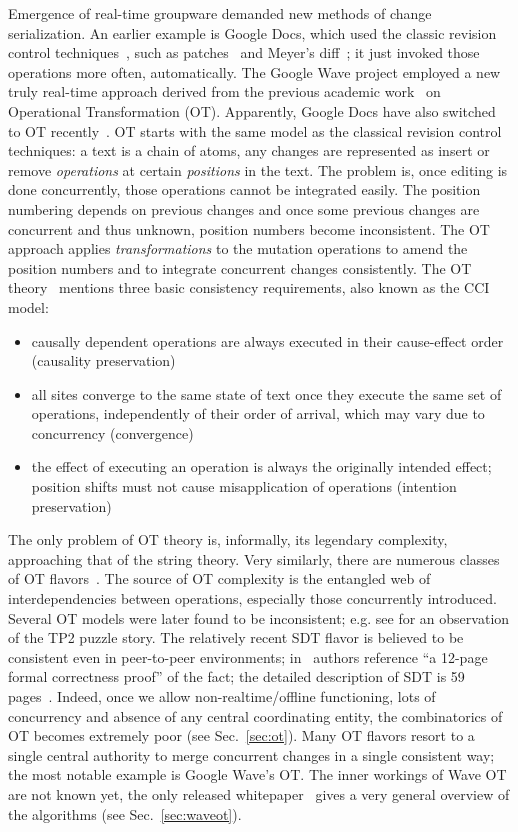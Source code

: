 \documentclass{sig-alternate}
\newenvironment{tightitem}{
\begin{itemize}
  \setlength{\itemsep}{1pt}
  \setlength{\parskip}{0pt}
  \setlength{\parsep}{0pt}}{\end{itemize}
}
\begin{document}
Emergence of real-time groupware demanded new methods of change serialization.
An earlier example is Google Docs, which used the classic revision control techniques~\cite{diff-match-patch}, such as patches~\cite{patch} and Meyer's diff~\cite{meyers-diff}; it just invoked those operations more often, automatically.
The Google Wave project employed a new truly real-time approach derived from the previous academic work~\cite{jupiter} on Operational Transformation (OT).
Apparently, Google Docs have also switched to OT recently~\cite{own-experience}.
OT starts with the same model as the classical revision control techniques: a text is a chain of atoms, any changes are represented as insert or remove \emph{operations} at certain \emph{positions} in the text.
The problem is, once editing is done concurrently, those operations cannot be integrated easily.
The position numbering depends on previous changes and once some previous changes are concurrent and thus unknown, position numbers become inconsistent.
The OT approach applies \emph{transformations} to the mutation operations to amend the position numbers and to integrate concurrent changes consistently. The OT theory~\cite{sun-achieving} mentions three basic consistency requirements, also known as the CCI model: 
\begin{tightitem}
\item causally dependent operations are always executed in their cause-effect order (causality preservation)
\item all sites converge to the same state of text once they execute the same set of operations, independently of their order of arrival, which may vary due to concurrency (convergence)
\item the effect of executing an operation is always the originally intended effect; position shifts must not cause misapplication of operations (intention preservation)
\end{tightitem}
The only problem of OT theory is, informally, its legendary complexity, approaching that of the string theory.
Very similarly, there are numerous classes of OT flavors~\cite{ot}.
The source of OT complexity is the entangled web of interdependencies between operations, especially those concurrently introduced.
Several OT models were later found to be inconsistent; e.g. see \cite{molli-proving, woot} for an observation of the TP2 puzzle story.
The relatively recent SDT flavor is believed to be consistent even in peer-to-peer environments; in~\cite{lili-preserving} authors reference ``a 12-page formal correctness proof'' of the fact; the detailed description of SDT is 59 pages~\cite{lili-ensuring}.
Indeed, once we allow non-realtime/offline functioning, lots of concurrency and absence of any central coordinating entity, the combinatorics of OT becomes extremely poor (see Sec.~\ref{sec:ot}).
Many OT flavors resort to a single central authority to merge concurrent changes in a single consistent way; the most notable example is Google Wave's OT.
The inner workings of Wave OT are not known yet, the only released whitepaper~\cite{waveot} gives a very general overview of the algorithms (see Sec.~\ref{sec:waveot}).
\end{document}
